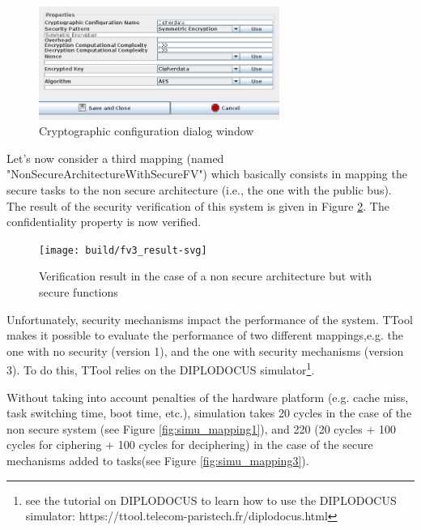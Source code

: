 \documentclass[12pt]{article}
\begin{document}
\begin{figure}[htbp]
\centering
\includegraphics[width=0.7\textwidth]{fig/ccdialog.png}
\caption{Cryptographic configuration dialog window} \label{fig:ccdialog}
\end{figure}

Let's now consider a third mapping (named "NonSecureArchitectureWithSecureFV") which basically consists in mapping the secure tasks to the non secure architecture (i.e., the one with the public bus). The result of the security verification of this system is given in Figure \ref{fig:fv3_result}. The confidentiality property is now verified.

\begin{figure}[htbp]
\centering
\texttt{[image: build/fv3\_result-svg]}
\caption{Verification result in the case of a non secure architecture but with secure functions} \label{fig:fv3_result}
\end{figure}

Unfortunately, security mechanisms impact the performance of the system. TTool makes it possible to evaluate the performance of two different mappings,e.g. the one with no security (version 1), and the one with security mechanisms (version 3). To do this, TTool relies on the DIPLODOCUS simulator\footnote{see the tutorial on DIPLODOCUS to learn how to use the DIPLODOCUS simulator: https://ttool.telecom-paristech.fr/diplodocus.html}.

Without taking into account penalties of the hardware platform (e.g. cache miss, task switching time, boot time, etc.), simulation takes 20 cycles in the case of the non secure system (see Figure \ref{fig:simu_mapping1}), and 220 (20 cycles + 100 cycles for ciphering + 100 cycles for deciphering) in the case of the secure mechanisms added to tasks(see Figure \ref{fig:simu_mapping3}).
\end{document}
